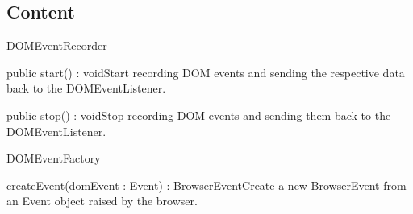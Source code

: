 \subsection{Content}
\begin{class}{DOMEventRecorder}




\begin{methods}
\begin{method}{public start() : void}{Start recording DOM events and sending the respective data back to the DOMEventListener.}
\end{method}
\begin{method}{public stop() : void}{Stop recording DOM events and sending them back to the DOMEventListener.}
\end{method}
\end{methods}
\end{class}

\begin{class}{DOMEventFactory}



\begin{methods}
\begin{method}{createEvent(domEvent : Event) : BrowserEvent}{Create a new BrowserEvent from an Event object raised by the browser.}
\begin{parameters}
\end{parameters}
\end{method}
\end{methods}
\end{class}